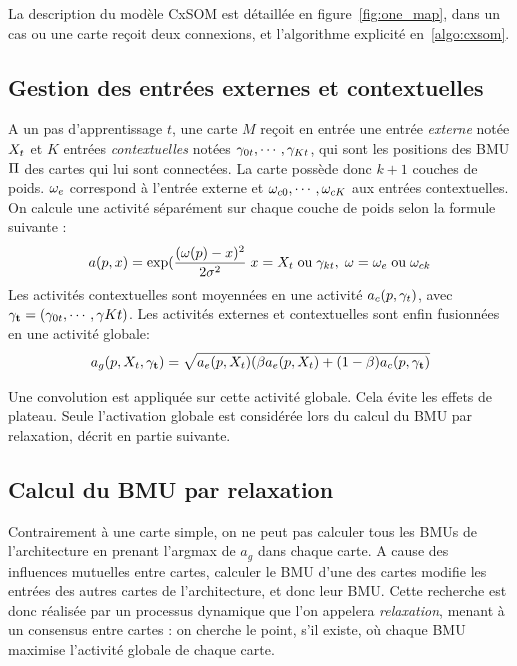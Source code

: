 La description du modèle CxSOM est détaillée en figure~\ref{fig:one_map}, dans un cas ou une carte reçoit deux connexions, et l'algorithme explicité en~\ref{algo:cxsom}.


\subsection{Gestion des entrées externes et contextuelles}

A un pas d'apprentissage $t$, une carte $M$ reçoit en entrée une entrée \emph{externe} notée $X_t$ et $K$ entrées \emph{contextuelles} notées $\gamma_{0t},\cdots,\gamma_{Kt}$, qui sont les positions des BMU $\Pi$ des cartes qui lui sont connectées. La carte possède donc $k+1$ couches de poids. $\omega_e$ correspond à l'entrée externe et $\omega_{c0}, \cdots, \omega_{cK}$ aux entrées contextuelles. On calcule une activité séparément sur chaque couche de poids selon la formule suivante : 
\begin{equation}
\label{eq:activite}
a(p,x) = \exp(\frac{(\omega(p)-x)^2}{2\sigma^2} \; x = X_t\; \text{ou}\; \gamma_{kt}, \; \omega = \omega_e \;\text{ou}\; \omega_{ck}
\end{equation}
Les activités contextuelles sont moyennées en une activité $a_c(p,\mathbf{\gamma}_t)$, avec $\mathbf{\gamma_t} = (\gamma_{0t}, \cdots, \gamma{Kt})$. 
Les activités externes et contextuelles sont enfin fusionnées en une activité globale:
\begin{equation}
\label{eq:global_act}
a_g(p,X_t,\mathbf{\gamma_t}) = \sqrt{a_e(p,X_t)(\beta a_e(p,X_t) + (1-\beta) a_c(p, \mathbf{\gamma_t})}
\end{equation}

Une convolution est appliquée sur cette activité globale. Cela évite les effets de plateau. Seule l'activation globale est considérée lors du calcul du BMU par relaxation, décrit en partie suivante. 

\subsection{Calcul du BMU par relaxation}

Contrairement à une carte simple, on ne peut pas calculer tous les BMUs de l'architecture en prenant l'argmax de $a_g$ dans chaque carte. A cause des influences mutuelles entre cartes, calculer le BMU d'une des cartes modifie les entrées des autres cartes de l'architecture, et donc leur BMU. Cette recherche est donc réalisée par un processus dynamique que l'on appelera \emph{relaxation}, menant à un consensus entre cartes : on cherche le point, s'il existe, où chaque BMU maximise l'activité globale de chaque carte.

